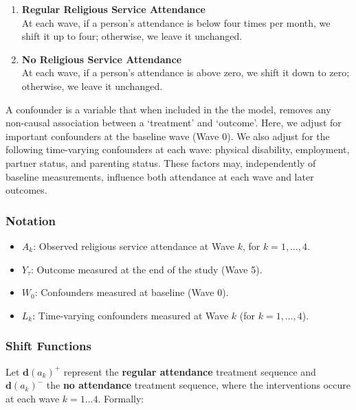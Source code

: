 \documentclass[
  single column]{article}
\providecommand{\tightlist}{%
  \setlength{\itemsep}{0pt}\setlength{\parskip}{0pt}}\usepackage{longtable,booktabs,array}
\begin{document}
\begin{enumerate}
\def\labelenumi{\arabic{enumi}.}
\item
  \textbf{Regular Religious Service Attendance}\\
  At each wave, if a person's attendance is below four times per month,
  we shift it up to four; otherwise, we leave it unchanged.
\item
  \textbf{No Religious Service Attendance}\\
  At each wave, if a person's attendance is above zero, we shift it down
  to zero; otherwise, we leave it unchanged.
\end{enumerate}

A confounder is a variable that when included in the the model, removes
any non-causal association between a `treatment' and `outcome'. Here, we
adjust for important confounders at the baseline wave (Wave 0). We also
adjust for the following time-varying confounders at each wave: physical
disability, employment, partner status, and parenting status. These
factors may, independently of baseline measurements, influence both
attendance at each wave and later outcomes.

\subsubsection{Notation}\label{notation}

\begin{itemize}
\tightlist
\item
  \(A_k\): Observed religious service attendance at Wave \(k\), for
  \(k = 1, \dots, 4\).\\
\item
  \(Y_\tau\): Outcome measured at the end of the study (Wave 5).\\
\item
  \(W_0\): Confounders measured at baseline (Wave 0).\\
\item
  \(L_k\): Time-varying confounders measured at Wave \(k\) (for
  \(k = 1, \dots, 4\)).
\end{itemize}

\subsubsection{Shift Functions}\label{shift-functions}

Let \(\boldsymbol{d}(a_k)^+\) represent the \textbf{regular attendance}
treatment sequence and \(\boldsymbol{d}(a_k)^-\) the \textbf{no
attendance} treatment sequence, where the interventions occure at each
wave \(k = 1\dots 4\). Formally:
\end{document}

